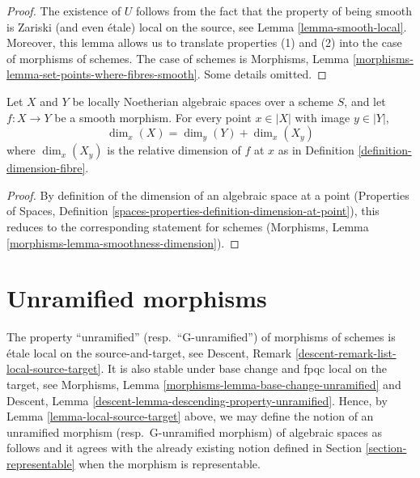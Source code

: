 \begin{proof}
The existence of $U$ follows from the fact that the property
of being smooth is Zariski (and even \'etale) local on the source, see
Lemma \ref{lemma-smooth-local}. Moreover, this lemma allows
us to translate properties (1) and (2) into the case
of morphisms of schemes. The case of schemes is
Morphisms, Lemma \ref{morphisms-lemma-set-points-where-fibres-smooth}.
Some details omitted.
\end{proof}

\begin{lemma}
\label{lemma-smoothness-dimension-spaces}
Let $X$ and $Y$ be locally Noetherian algebraic spaces over a scheme
$S$, and let $f : X \to Y$ be a smooth morphism.
For every point $x \in |X|$ with image $y \in |Y|$,
$$
\dim_x(X) = \dim_y(Y) + \dim_x(X_y)
$$
where $\dim_x(X_y)$ is the relative dimension of $f$ at $x$ as
in Definition \ref{definition-dimension-fibre}.
\end{lemma}

\begin{proof}
By definition of the dimension of an algebraic space
at a point (Properties of Spaces, Definition
\ref{spaces-properties-definition-dimension-at-point}),
this reduces to the corresponding statement for schemes
(Morphisms, Lemma \ref{morphisms-lemma-smoothness-dimension}).
\end{proof}



\section{Unramified morphisms}
\label{section-unramified}

\noindent
The property ``unramified'' (resp.\ ``G-unramified'')
of morphisms of schemes is \'etale local on the source-and-target, see
Descent, Remark \ref{descent-remark-list-local-source-target}.
It is also stable under base change and fpqc local on the target, see
Morphisms, Lemma \ref{morphisms-lemma-base-change-unramified} and
Descent, Lemma \ref{descent-lemma-descending-property-unramified}.
Hence, by
Lemma \ref{lemma-local-source-target}
above, we may define the notion of an unramified morphism
(resp.\ G-unramified morphism) of algebraic spaces
as follows and it agrees with the already existing notion defined in
Section \ref{section-representable}
when the morphism is representable.

